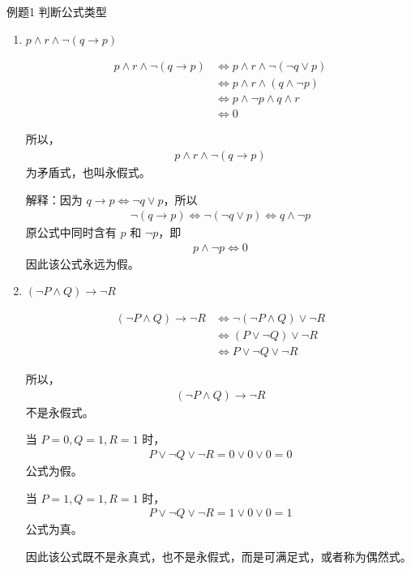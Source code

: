 \begin{question}{例题1}
	判断公式类型
	\begin{enumerate}
		
		\item \(p \land r \land \neg(q \to p)\)
		
		\begin{align*}
			p \land r \land \neg(q \to p)
			&\Leftrightarrow p \land r \land \neg(\neg q \lor p) \\
			&\Leftrightarrow p \land r \land (q \land \neg p) \\
			&\Leftrightarrow p \land \neg p \land q \land r \\
			&\Leftrightarrow 0
		\end{align*}
		
		所以，
		\begin{align*}
			p \land r \land \neg(q \to p)
		\end{align*}
		为矛盾式，也叫永假式。
		
		解释：因为 \(q \to p \Leftrightarrow \neg q \lor p\)，所以
		\begin{align*}
			\neg(q \to p) \Leftrightarrow \neg(\neg q \lor p)
			\Leftrightarrow q \land \neg p
		\end{align*}
		原公式中同时含有 \(p\) 和 \(\neg p\)，即
		\begin{align*}
			p \land \neg p \Leftrightarrow 0
		\end{align*}
		因此该公式永远为假。
		
		\item \((\neg P \land Q) \to \neg R\)
		
		\begin{align*}
			(\neg P \land Q) \to \neg R
			&\Leftrightarrow \neg(\neg P \land Q) \lor \neg R \\
			&\Leftrightarrow (P \lor \neg Q) \lor \neg R \\
			&\Leftrightarrow P \lor \neg Q \lor \neg R
		\end{align*}
		
		所以，
		\begin{align*}
			(\neg P \land Q) \to \neg R
		\end{align*}
		不是永假式。
		
		当 \(P=0,Q=1,R=1\) 时，
		\begin{align*}
			P \lor \neg Q \lor \neg R
			=0 \lor 0 \lor 0
			=0
		\end{align*}
		公式为假。
		
		当 \(P=1,Q=1,R=1\) 时，
		\begin{align*}
			P \lor \neg Q \lor \neg R
			=1 \lor 0 \lor 0
			=1
		\end{align*}
		公式为真。
		
		因此该公式既不是永真式，也不是永假式，而是可满足式，或者称为偶然式。
		
	\end{enumerate}
\end{question}

